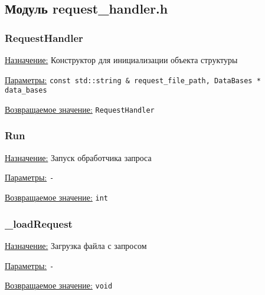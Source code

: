 \subsection{Модуль request\_handler.h}


\subsubsection{RequestHandler}

\underline{Назначение:} Конструктор для инициализации объекта структуры

\underline{Параметры:} \verb|const std::string & request_file_path, DataBases * data_bases|

\underline{Возвращаемое значение:} \verb|RequestHandler|


\subsubsection{Run} 

\underline{Назначение:} Запуск обработчика запроса

\underline{Параметры:} \verb|-|

\underline{Возвращаемое значение:} \verb|int|


\subsubsection{\_loadRequest}

\underline{Назначение:} Загрузка файла с запросом

\underline{Параметры:} \verb|-|

\underline{Возвращаемое значение:} \verb|void|

